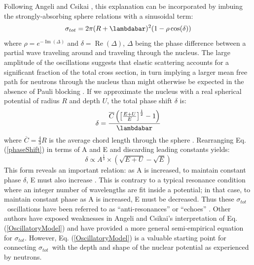 \documentclass[twocolumn,secnumarabic,amssymb, nobibnotes, aps, prl,
superscriptaddress, nobalancelastpage, draft]{revtex4}
\newcommand{\tot}{\ensuremath{\sigma_{tot}}}
\begin{document}
Following Angeli and Csikai \cite{Angeli1970}, this explanation can be
incorporated by imbuing the strongly-absorbing sphere relations
with a sinusoidal term:
\begin{equation} \label{OscillatoryModel}
    \tot = 2\pi (R+\lambdabar)^{2}(1 - \rho \cos(\delta))
\end{equation}
where $\rho = e^{-\operatorname{Im}(\Delta)}$ and $\delta =
\operatorname{Re}(\Delta)$, $\Delta$ being the phase difference between a
partial wave traveling
around and traveling through the nucleus. The large amplitude of the
oscillations suggests that elastic scattering accounts for a
significant fraction of the total cross section, in turn implying a 
larger mean free path for neutrons through the nucleus 
than might otherwise be expected in the absence of Pauli blocking
\cite{Mohr1955, Feshbach1958}.
If we approximate the nucleus with a
real spherical potential of radius $R$ and depth $U$, the total phase shift $\delta$ is:
\begin{equation} \label{phaseShift}
    \delta =
    \frac{\overline{C}\left(\left[{\frac{E+U}{E}}\right]^{\frac{1}{2}}-1\right)}{\lambdabar}
\end{equation}
where $\overline{C} = \frac{4}{3}R$ is the average chord length through the
sphere \cite{Angeli1970}. Rearranging Eq. (\ref{phaseShift}) in terms of A and E and
discarding leading constants yields:
\begin{equation}
    \delta \propto A^{\frac{1}{3}}\times\left(\sqrt{E+U}-\sqrt{E}\right)
\end{equation}
This form reveals an important relation: as A is increased, to maintain constant 
phase $\delta$, E must also increase \cite{Satchler1980, Peterson1962}. 
This is contrary to a typical resonance condition where an integer number of wavelengths
are fit inside a potential; in that case, to maintain constant phase as A is increased,
E must be decreased. Thus these \tot\ oscillations have been referred to as
``anti-resonances'' or ``echoes'' \cite{Satchler1980, McVoy1967}.
Other authors \cite{Ahmad1973} have
exposed weaknesses in Angeli and Csikai's interpretation of
Eq. (\ref{OscillatoryModel}) and have provided a more general semi-empirical
equation for \tot. However, Eq. (\ref{OscillatoryModel}) is a valuable starting
point for connecting \tot\ with the depth and shape of the nuclear
potential as experienced by neutrons.
\end{document}
